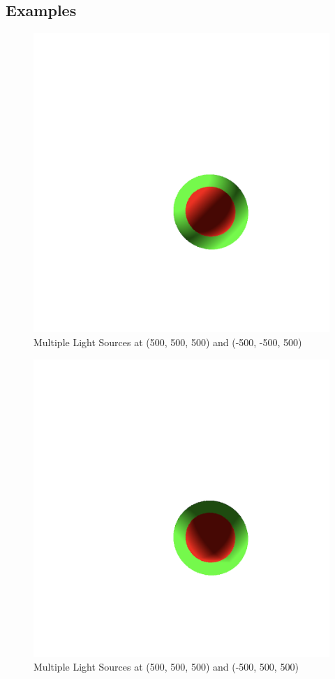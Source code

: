 \documentclass{article}
\begin{document}
\subsection{Examples}
\begin{centering}
\begin{figure}[H]
\includegraphics[width=1\textwidth]{./images/multiple-ls.png}
\caption{Multiple Light Sources at (500, 500, 500) and (-500, -500, 500) }
\label{fig:ml1}
\end{figure}
\begin{figure}[H]
\includegraphics[width=1\textwidth]{./images/multiple-ls2.png}
\caption{Multiple Light Sources at (500, 500, 500) and (-500, 500, 500) }
\label{fig:ml2}
\end{figure}
\end{centering}
\end{document}
